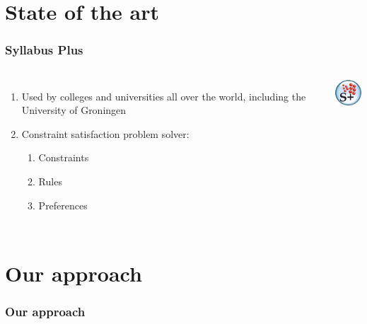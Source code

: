 \documentclass{beamer}
\begin{document}
\section{State of the art}
\begin{frame}
	\frametitle{Syllabus Plus}
	\begin{columns}%
    \begin{enumerate}
		\item Used by colleges and universities all over the world, including the University of Groningen
		\item Constraint satisfaction problem solver:
		\begin{enumerate}
			\item Constraints
			\item Rules
			\item Preferences
		\end{enumerate}
	\end{enumerate}
    \includegraphics[width=\textwidth]{SyllabusPlus.png}
    \end{columns}	
\end{frame}

\section{Our approach}
\begin{frame}
	\frametitle{Our approach}
\end{frame}
\end{document}
